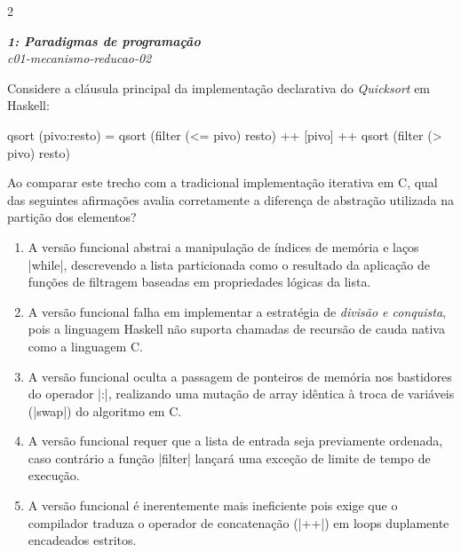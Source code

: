\documentclass[a4paper,10pt,brazil]{article}
\begin{document}
\begin{multicols}{2}
\begin{flushright}
  \footnotesize
  \textit{\textbf{1: Paradigmas de programação}}\\
  \textit{c01-mecanismo-reducao-02}\\

\end{flushright}
Considere a cláusula principal da implementação declarativa do \emph{Quicksort} em Haskell:

\begin{haskellcode}
qsort (pivo:resto) = qsort (filter (<= pivo) resto) ++ 
                     [pivo] ++ 
                     qsort (filter (> pivo) resto)
\end{haskellcode}

Ao comparar este trecho com a tradicional implementação iterativa em C, qual das seguintes afirmações avalia corretamente a diferença de abstração utilizada na partição dos elementos?

\begin{enumerate}
  \item A versão funcional abstrai a manipulação de índices de memória e laços \cinline|while|, descrevendo a lista particionada como o resultado da aplicação de funções de filtragem baseadas em propriedades lógicas da lista.

  \item A versão funcional falha em implementar a estratégia de \emph{divisão e conquista}, pois a linguagem Haskell não suporta chamadas de recursão de cauda nativa como a linguagem C.

  \item A versão funcional oculta a passagem de ponteiros de memória nos bastidores do operador \haskellinline|:|, realizando uma mutação de array idêntica à troca de variáveis (\cinline|swap|) do algoritmo em C.

  \item A versão funcional requer que a lista de entrada seja previamente ordenada, caso contrário a função \haskellinline|filter| lançará uma exceção de limite de tempo de execução.

  \item A versão funcional é inerentemente mais ineficiente pois exige que o compilador traduza o operador de concatenação (\haskellinline|++|) em loops duplamente encadeados estritos.


\end{enumerate}


\end{multicols}
\end{document}
